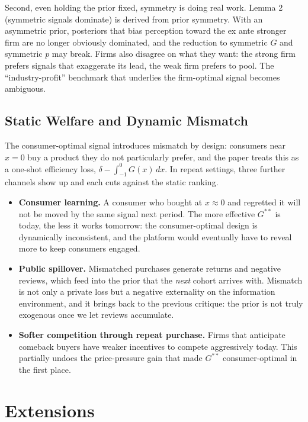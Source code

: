 \documentclass[12pt, a4paper]{article}
\begin{document}
Second, even holding the prior fixed, symmetry is doing real work. Lemma 2 (symmetric signals dominate) is derived from prior symmetry. With an asymmetric prior, posteriors that bias perception toward the ex ante stronger firm are no longer obviously dominated, and the reduction to symmetric $G$ and symmetric $p$ may break. Firms also disagree on what they want: the strong firm prefers signals that exaggerate its lead, the weak firm prefers to pool. The ``industry-profit'' benchmark that underlies the firm-optimal signal becomes ambiguous.

\subsection{Static Welfare and Dynamic Mismatch}

The consumer-optimal signal introduces mismatch by design: consumers near $x = 0$ buy a product they do not particularly prefer, and the paper treats this as a one-shot efficiency loss, $\delta - \int_{-1}^{0} G(x)\,dx$. In repeat settings, three further channels show up and each cuts against the static ranking.

\begin{itemize}[nosep]
    \item \textbf{Consumer learning.} A consumer who bought at $x \approx 0$ and regretted it will not be moved by the same signal next period. The more effective $G^{**}$ is today, the less it works tomorrow: the consumer-optimal design is dynamically inconsistent, and the platform would eventually have to reveal more to keep consumers engaged.
    \item \textbf{Public spillover.} Mismatched purchases generate returns and negative reviews, which feed into the prior that the \emph{next} cohort arrives with. Mismatch is not only a private loss but a negative externality on the information environment, and it brings back to the previous critique: the prior is not truly exogenous once we let reviews accumulate.
    \item \textbf{Softer competition through repeat purchase.} Firms that anticipate comeback buyers have weaker incentives to compete aggressively today. This partially undoes the price-pressure gain that made $G^{**}$ consumer-optimal in the first place.
\end{itemize}



\section{Extensions}
\end{document}
